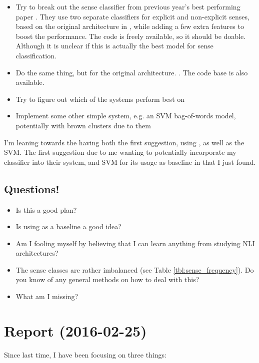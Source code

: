 \begin{itemize}
	\item Try to break out the sense classifier from previous year's best performing paper \citep{wang_refined_2015}. They use two separate classifiers for explicit and non-explicit senses, based on the original architecture in \cite{lin_pdtbstyled_2014}, while adding a few extra features to boost the performance. The code is freely available, so it should be doable. Although it is unclear if this is actually the best model for sense classification.
	\item Do the same thing, but for the original architecture. \citep{lin_pdtbstyled_2014}. The code base is also available.
	\item Try to figure out which of the systems perform best on
	\item Implement some other simple system, e.g. an SVM bag-of-words model, potentially with brown clusters due to them
\end{itemize}

I'm leaning towards the having both the first suggestion, using \cite{wang_refined_2015}, as well as the SVM. The first suggestion due to me wanting to potentially incorporate my classifier into their system, and SVM for its usage as baseline in \cite{zhang_shallow_2015} that I just found.

\subsection{Questions!}

\begin{itemize}
	\item Is this a good plan?
	\item Is using \cite{wang_refined_2015} as a baseline a good idea?
	\item Am I fooling myself by believing that I can learn anything from studying NLI architectures?
	\item The sense classes are rather imbalanced (see Table \ref{tbl:sense_frequency}). Do you know of any general methods on how to deal with this?
	\item What am I missing?
\end{itemize}

\section{Report (2016-02-25)}

Since last time, I have been focusing on three things:

